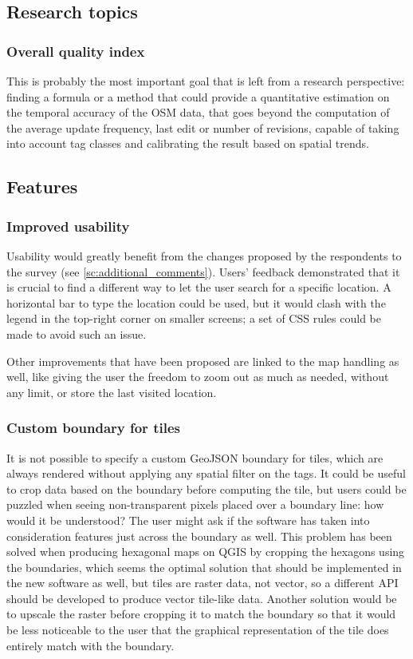 \documentclass{Configuration_Files/PoliMi3i_thesis}
\begin{document}
\subsection{Research topics}

\subsubsection{Overall quality index}

This is probably the most important goal that is left from a research perspective: finding a formula or a method that could provide a quantitative estimation on the temporal accuracy of the OSM data, that goes beyond the computation of the average update frequency, last edit or number of revisions, capable of taking into account  tag classes and calibrating the result based on spatial trends.

\subsection{Features}

\subsubsection{Improved usability}

Usability would greatly benefit from the changes proposed by the respondents to the survey (see \ref{sc:additional_comments}).
Users' feedback demonstrated that it is crucial to find a different way to let the user search for a specific location. A horizontal bar to type the location could be used, but it would clash with the legend in the top-right corner on smaller screens; a set of CSS rules could be made to avoid such an issue.

Other improvements that have been proposed are linked to the map handling as well, like giving the user the freedom to zoom out as much as needed, without any limit, or store the last visited location.

\subsubsection{Custom boundary for tiles}

It is not possible to specify a custom GeoJSON boundary for tiles, which are always rendered without applying any spatial filter on the tags. It could be useful to crop data based on the boundary before computing the tile, but users could be puzzled when seeing non-transparent pixels placed over a boundary line: how would it be understood? The user might ask if the software has taken into consideration features just across the boundary as well.
This problem has been solved when producing hexagonal maps on QGIS by cropping the hexagons using the boundaries, which seems the optimal solution that should be implemented in the new software as well, but tiles are raster data, not vector, so a different API should be developed to produce vector tile-like data.
Another solution would be to upscale the raster before cropping it to match the boundary so that it would be less noticeable to the user that the graphical representation of the tile does entirely match with the boundary.
\end{document}
